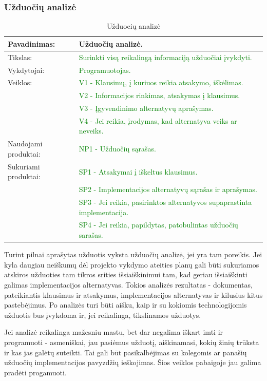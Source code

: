 \documentclass{VUMIFPSkursinis}
\begin{document}
	\subsubsection{Užduočių analizė}
	\begin{center}
		\begin{table}[ht]
			\caption{Užduocių analizė}
			\begin{tabular}{ | l | l | }
				\hline
				Pavadinimas:		& Užduočių analizė.								\\ \hline
				Tikslas:		& \textcolor{green}{Surinkti visą reikalingą informaciją užduočiai įvykdyti.}			\\ \hline
				Vykdytojai:		& \textcolor{green}{Programuotojas.}								\\ \hline
				Veiklos:		& \textcolor{green}{V1 - Klausimų, į kuriuos reikia atsakymo, iškėlimas.	}			\\
							& \textcolor{green}{V2 - Informacijos rinkimas, atsakymas į klausimus.}				\\
							& \textcolor{green}{V3 - Įgyvendinimo alternatyvų aprašymas.}					\\
							& \textcolor{green}{V4 - Jei reikia, įrodymas, kad alternatyva veiks ar neveiks.}			\\ \hline
				Naudojami produktai:	&\textcolor{green}{ NP1 - Užduočių sąrašas. }							\\ \hline
				Sukuriami produktai:	& \textcolor{green}{SP1 - Atsakymai į iškeltus klausimus.}						\\
							& \textcolor{green}{SP2 - Implementacijos alternatyvų sąrašas ir aprašymas.	}		\\
							& \textcolor{green}{SP3 - Jei reikia, pasirinktos alternatyvos supaprastinta implementacija.}	\\
							& \textcolor{green}{SP4 - Jei reikia, papildytas, patobulintas užduočių sarašas.}			\\ \hline
			\end{tabular}
		\end{table}
	\end{center}
	Turint pilnai aprašytas užduotis vyksta užduočių analizė, jei yra tam poreikis.
	Jei kyla daugiau neiškumų dėl projekto vykdymo ateities planų gali būti sukuriamos atskiros užduoties tam tikros srities išsiaiškinimui tam, kad geriau išsiaiškinti galimas implementacijos alternatyvas.
	Tokios analizės rezultatas - dokumentas, pateikiantis klausimus ir atsakymus, implementacijos alternatyvas ir kilusius kitus pastebėjimus.
	Po analizės turi būti aišku, kaip ir su kokiomis technologijomis užduotis bus įvykdoma ir, jei reikalinga, tikslinamos užduotys.
	\par
	Jei analizė reikalinga mažesniu mastu, bet dar negalima iškart imti ir programuoti - asmeniškai, jau pasiėmus užduotį, aiškinamasi, kokių žinių trūksta ir kas jas galėtų suteikti.
	Tai gali būt pasikalbėjimas su kolegomis ar panašių užduočių implementacijos pavyzdžių ieškojimas.
	Šios veiklos pabaigoje jau galima pradėti progamuoti.
\end{document}
